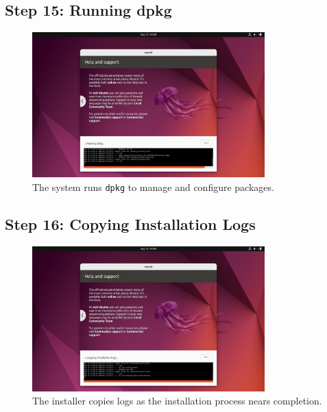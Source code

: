 \documentclass{article}
\begin{document}
\subsection{Step 15: Running dpkg}
\begin{figure}[H]
    \centering
    \includegraphics[width=0.8\textwidth]{2024-09-17_04-39-32.png}
    \caption{The system runs \texttt{dpkg} to manage and configure packages.}
\end{figure}

\subsection{Step 16: Copying Installation Logs}
\begin{figure}[H]
    \centering
    \includegraphics[width=0.8\textwidth]{2024-09-17_04-40-40.png}
    \caption{The installer copies logs as the installation process nears completion.}
\end{figure}
\end{document}
